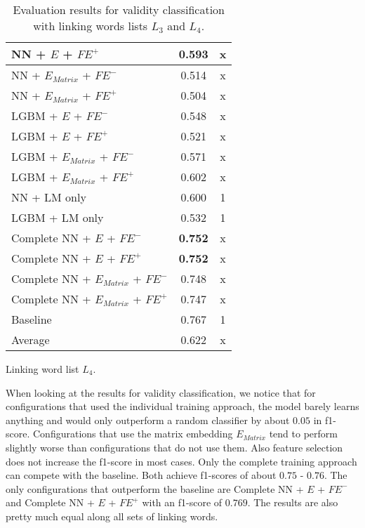 \begin{table}[h]
\begin{subtable}{.5\textwidth}
\begin{tabular}{|| l || c | c ||}
 			\hline
 			NN + $E$ + $\textit{FE}^+$ & 0.593 & x \\
 			\hline
 			NN + $E_{Matrix}$ + $\textit{FE}^-$ & 0.514 & x \\
 			\hline
 			NN + $E_{Matrix}$ + $\textit{FE}^+$ & 0.504 & x \\
 			\hline
 			LGBM + $E$ + $\textit{FE}^-$ & 0.548 & x \\
 			\hline
 			LGBM + $E$ + $\textit{FE}^+$ & 0.521 & x \\
 			\hline
 			LGBM + $E_{Matrix}$ + $\textit{FE}^-$ & 0.571 & x \\
 			\hline
 			LGBM + $E_{Matrix}$ + $\textit{FE}^+$ & 0.602 & x \\
 			\hline
 			NN + LM only & 0.600 & 1 \\
 			\hline
 			LGBM + LM only & 0.532 & 1 \\
 			\hline
 			Complete NN + $E$ + $\textit{FE}^-$ & \textbf{0.752} & x \\
 			\hline
 			Complete NN + $E$ + $\textit{FE}^+$ & \textbf{0.752} & x \\
 			\hline
 			Complete NN + $E_{Matrix}$ + $\textit{FE}^-$ & 0.748 & x \\
 			\hline
 			Complete NN + $E_{Matrix}$ + $\textit{FE}^+$ & 0.747 & x \\
 			\hline
 			Baseline & 0.767 & 1\\
 			\hline
 			\hline
 			Average & 0.622 & x \\
 			\hline
		\end{tabular}
		\renewcommand{\arraystretch}{1}
  		\caption{Linking word list $L_4$.}%
  	\end{subtable}
  	\caption{Evaluation results for validity classification with linking words lists $L_3$ and $L_4$.}%
  	\label{fig:validityresults2}
\end{table}

When looking at the results for validity classification, we notice that for configurations that used the individual training approach, the model barely learns anything and would only outperform a random classifier by about $0.05$ in f1-score. Configurations that use the matrix embedding $E_{Matrix}$ tend to perform slightly worse than configurations that do not use them. Also feature selection does not increase the f1-score in most cases. Only the complete training approach can compete with the baseline. Both achieve f1-scores of about $0.75$ - $0.76$. The only configurations that outperform the baseline are 
Complete NN + $E$ + $\textit{FE}^-$ and Complete NN + $E$ + $\textit{FE}^+$ with an f1-score of $0.769$. The results are also pretty much equal along all sets of linking words.

